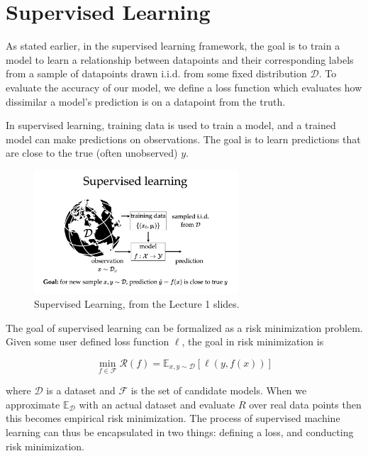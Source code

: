 \graphicspath{ {./1-supervised-learning/} }

\chapter{Supervised Learning}


As stated earlier, in the supervised learning framework, the goal is to train a model to learn a relationship between datapoints and their corresponding labels from a sample of datapoints drawn i.i.d. from some fixed distribution $\mathcal{D}$. To evaluate the accuracy of our model, we define a loss function which evaluates how dissimilar a model's prediction is on a datapoint from the truth.


In supervised learning, training data is used to train a model, and a trained model can make predictions on observations. The goal is to learn predictions that are close to the true (often unobserved) $y$.

\begin{figure}
\centering
\includegraphics[width=3in]{graphics/sup_learning.png}
\caption{Supervised Learning, from the Lecture 1 slides.}
\end{figure}

The goal of supervised learning can be formalized as a risk minimization problem.
Given some user defined loss function $\ell$, the goal in risk minimization is 

\begin{equation}
\min_{f \in \mathcal{F}} \mathcal{R}(f) = \mathbb{E}_{x, y \sim \mathcal{D}} [\ell(y, f(x))]
\end{equation}

where $\mathcal{D}$ is a dataset and $\mathcal{F}$ is the set of candidate models. When we approximate $\mathbb{E}_{\mathcal{D}}$ with an actual dataset and evaluate $R$ over real data points then this becomes empirical risk minimization.
The process of supervised machine learning can thus be encapsulated in two things: defining a loss, and conducting risk minimization. 

